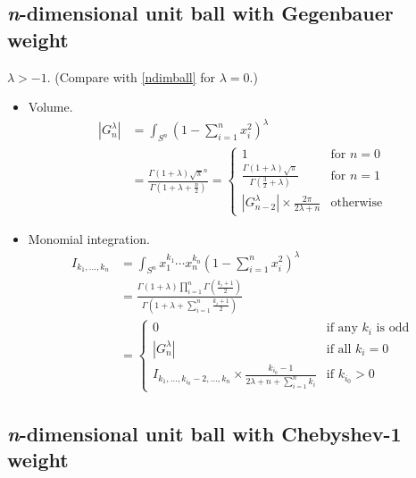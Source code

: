 \documentclass[draft]{scrartcl}
\begin{document}
\subsection*{\textit{n}-dimensional unit ball with Gegenbauer weight}
  $\lambda > -1.$ (Compare with \eqref{ndimball} for $\lambda = 0$.) \cite{3695653}
\begin{itemize}
  \item Volume.
    \begin{align}\nonumber
    |G_n^{\lambda}|
      &= \int_{S^n} \left(1 - \sum_{i=1}^n x_i^2\right)^\lambda\\
      &= \frac{
        \Gamma(1+\lambda)\sqrt{\pi}^n
      }{
        \Gamma\left(1+\lambda + \frac{n}{2}\right)
      }
      = \begin{cases}
        1&\text{for $n=0$}\\
        \frac{\Gamma(1+\lambda)\sqrt{\pi}}{\Gamma\left(\frac{3}{2} + \lambda\right)}&\text{for $n=1$}\\
        |G_{n-2}^{\lambda}|\times \frac{2\pi}{2\lambda + n}&\text{otherwise}
      \end{cases}
  \end{align}

  \item Monomial integration.
  \begin{align}\nonumber
    I_{k_1,\dots,k_n}
      &= \int_{S^n} x_1^{k_1}\cdots x_n^{k_n} \left(1 - \sum_{i=1}^n
      x_i^2\right)^\lambda\\
      &= \frac{
        \Gamma(1+\lambda)\prod_{i=1}^n \Gamma\left(\frac{k_i+1}{2}\right)
      }{
        \Gamma\left(1+\lambda + \sum_{i=1}^n \frac{k_i+1}{2}\right)
      }\\
      &= \begin{cases}
        0&\text{if any $k_i$ is odd}\\
        |G_n^{\lambda}|&\text{if all $k_i=0$}\\
        I_{k_1,\dots,k_{i_0}-2,\dots,k_n} \times \frac{k_{i_0}-1}{2\lambda + n + \sum_{i=1}^n k_i}&\text{if $k_{i_0} > 0$}
      \end{cases}
  \end{align}
\end{itemize}


\subsection*{\textit{n}-dimensional unit ball with Chebyshev-1 weight}
\end{document}
